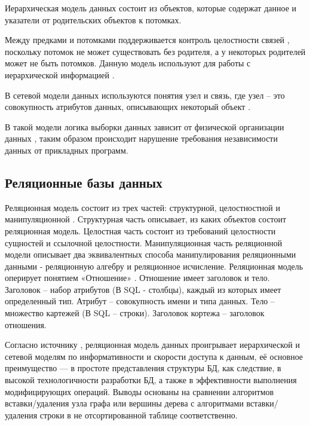 Иерархическая модель данных состоит из объектов, которые содержат данное и указатели от родительских объектов к потомках. 


Между предками и потомками поддерживается контроль целостности связей \cite{dm}, поскольку потомок не может существовать без родителя, а у некоторых родителей может не быть потомков. Данную модель используют для работы с иерархической информацией \cite{dm}. 

В сетевой модели данных используются понятия узел и связь, где узел -- это совокупность атрибутов данных, описывающих некоторый объект \cite{bd:2023}. 


В такой модели логика выборки данных зависит от физической организации данных \cite{bd:2023}, таким образом происходит нарушение требования независимости данных от прикладных программ. 

\subsection{Реляционные базы данных}

Реляционная модель состоит из трех частей: структурной, целостностной и манипуляционной \cite{bd:2023}. 
Структурная часть описывает, из каких объектов состоит реляционная модель. 
Целостная часть состоит из требований целостности сущностей и ссылочной целостности.
Манипуляционная часть реляционной модели описывает два эквивалентных способа
манипулирования реляционными данными - реляционную алгебру и реляционное исчисление.
Реляционная модель оперирует понятием «Отношение» \cite{bd:2023}. 
Отношение имеет заголовок и тело. 
Заголовок – набор атрибутов (В SQL - столбцы), каждый из которых имеет определенный тип. 
Атрибут – совокупность имени и типа данных. 
Тело – множество картежей (В SQL – строки). 
Заголовок кортежа – заголовок отношения.

Согласно источнику \cite{relat}, реляционная модель данных проигрывает иерархической и сетевой моделям по информативности и скорости доступа к данным, её основное преимущество — в простоте представления структуры БД, как следствие, в высокой технологичности разработки БД, а также в эффективности выполнения модифицирующих операций. Выводы основаны на сравнении алгоритмов вставки/удаления узла графа или вершины дерева с алгоритмами вставки/удаления строки в не отсортированной таблице соответственно.

